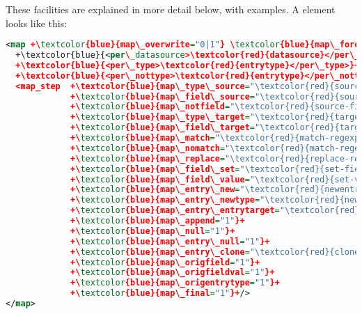 \documentclass{ltxdockit}
\begin{document}
\noindent These facilities are explained in more detail below, with
examples. A  element looks like this:

\begin{lstlisting}[language=xml,escapechar=+,mathescape=true]
<map +\textcolor{blue}{map\_overwrite="0|1"} \textcolor{blue}{map\_foreach="\textcolor{red}{loopval}"}+>
  +\textcolor{blue}{<per\_datasource>\textcolor{red}{datasource}</per\_datasource>}+
  +\textcolor{blue}{<per\_type>\textcolor{red}{entrytype}</per\_type>}+
  +\textcolor{blue}{<per\_nottype>\textcolor{red}{entrytype}</per\_nottype>}+
  <map_step  +\textcolor{blue}{map\_type\_source="\textcolor{red}{source-entrytype}"}+
             +\textcolor{blue}{map\_field\_source="\textcolor{red}{source-field}"}+
             +\textcolor{blue}{map\_notfield="\textcolor{red}{source-field}"}+
             +\textcolor{blue}{map\_type\_target="\textcolor{red}{target-entrytype}"}+
             +\textcolor{blue}{map\_field\_target="\textcolor{red}{target-field}"}+
             +\textcolor{blue}{map\_match="\textcolor{red}{match-regexp}"}+
             +\textcolor{blue}{map\_nomatch="\textcolor{red}{match-regexp}"}+
             +\textcolor{blue}{map\_replace="\textcolor{red}{replace-regexp}"}+
             +\textcolor{blue}{map\_field\_set="\textcolor{red}{set-field}"}+
             +\textcolor{blue}{map\_field\_value="\textcolor{red}{set-value}"}+
             +\textcolor{blue}{map\_entry\_new="\textcolor{red}{newentrykey}"}+
             +\textcolor{blue}{map\_entry\_newtype="\textcolor{red}{newentrykeytype}"}+
             +\textcolor{blue}{map\_entry\_entrytarget="\textcolor{red}{newentrykey}"}+
             +\textcolor{blue}{map\_append="1"}+
             +\textcolor{blue}{map\_null="1"}+
             +\textcolor{blue}{map\_entry\_null="1"}+
             +\textcolor{blue}{map\_entry\_clone="\textcolor{red}{clonekey}"}+
             +\textcolor{blue}{map\_origfield="1"}+
             +\textcolor{blue}{map\_origfieldval="1"}+
             +\textcolor{blue}{map\_origentrytype="1"}+
             +\textcolor{blue}{map\_final="1"}+/>
</map>
\end{lstlisting}%
\end{document}
